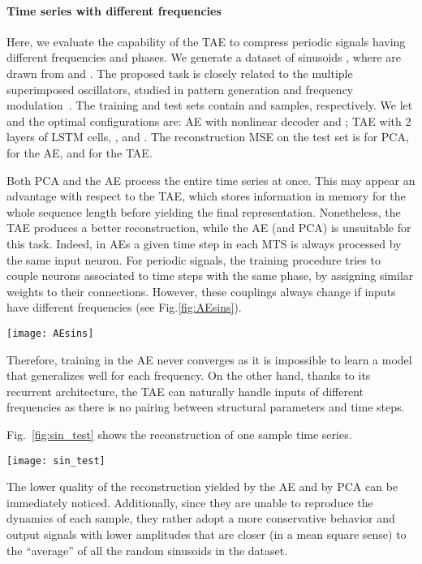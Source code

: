 \documentclass[a4paper,10pt,pdftex]{article}
\begin{document}
\paragraph{\textbf{Time series with different frequencies}}

Here, we evaluate the capability of the TAE to compress periodic signals having different frequencies and phases.
We generate a dataset of sinusoids , where  are drawn from  and .
The proposed task is closely related to the multiple superimposed oscillators, studied in pattern generation and frequency modulation~\cite{sussillo2009generating}.
The training and test sets contain  and  samples, respectively.
We let  and the optimal configurations are: AE with nonlinear decoder and ; TAE with 2 layers of LSTM cells, , and .
The reconstruction MSE on the test set is  for PCA,  for the AE, and  for the TAE.

Both PCA and the AE process the entire time series at once. This may appear an advantage with respect to the TAE, which stores information in memory for the whole sequence length before yielding the final representation.
Nonetheless, the TAE produces a better reconstruction, while the AE (and PCA) is unsuitable for this task.
Indeed, in AEs a given time step  in each MTS is always processed by the same input neuron.
For periodic signals, the training procedure tries to couple neurons associated to time steps with the same phase, by assigning similar weights to their connections. However, these couplings always change if inputs have different frequencies (see Fig.\ref{fig:AEsins}).
\begin{SCfigure}[0.8][th!]
    \centering
    \texttt{[image: AEsins]}
    \caption{Periodic inputs with different frequencies generate different activation patterns in AEs. 
    It is not possible to learn connections weights that preserve neurons couplings for each frequency.}
    \label{fig:AEsins}
\end{SCfigure}
Therefore, training in the AE never converges as it is impossible to learn a model that generalizes well for each frequency.
On the other hand, thanks to its recurrent architecture, the TAE can naturally handle inputs of different frequencies as there is no pairing between structural parameters and time steps.

Fig.~\ref{fig:sin_test} shows the reconstruction of one sample time series.
\begin{SCfigure}[0.8][th!]
    \centering
    \texttt{[image: sin\_test]}	
    \caption{\hspace{0pt}Reconstructions obtained by PCA, AE, and TAE on a sample sinusoid, whose frequency and phase are randomly chosen.}
    \label{fig:sin_test}
\end{SCfigure}
The lower quality of the reconstruction yielded by the AE and by PCA can be immediately noticed. 
Additionally, since they are unable to reproduce the dynamics of each sample, they rather adopt a more conservative behavior and output signals with lower amplitudes that are closer (in a mean square sense) to the ``average'' of all the random sinusoids in the dataset.
\end{document}
